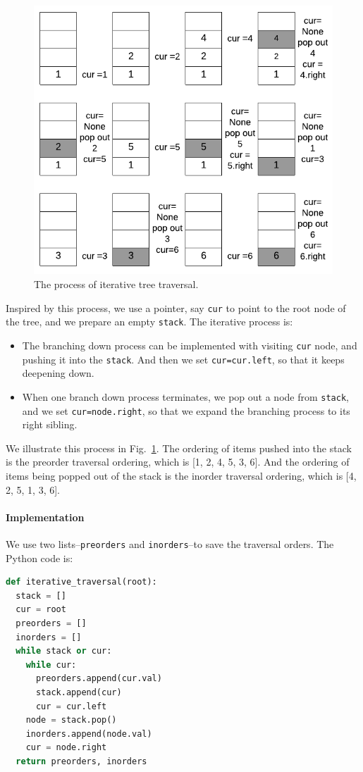 \documentclass[main.tex]{subfiles}
\begin{document}
\begin{figure}[!ht]
    \centering
    \includegraphics[width = .9\columnwidth]{fig/iterative_tree_traversal.png}
    \caption{The process of iterative tree traversal.}
    \label{fig:iterative_tree_traveral}
\end{figure}

Inspired by this process, we use a pointer, say \texttt{cur} to point to the root node of the tree, and we prepare an empty \texttt{stack}. The iterative process is:
\begin{itemize}
    \item The branching down process can be implemented with visiting  \texttt{cur} node, and pushing it into the \texttt{stack}. And then we set \texttt{cur=cur.left}, so that it keeps deepening down. 
    \item When one branch down process terminates, we pop out a node from \texttt{stack}, and we set \texttt{cur=node.right}, so that we expand the branching process to its right sibling. 
\end{itemize}
We illustrate this process in Fig.~\ref{fig:iterative_tree_traveral}. The ordering of items pushed into the stack is the preorder traversal ordering, which is [1, 2, 4, 5, 3, 6]. And the ordering of items being popped out of the stack is the inorder traversal ordering, which is [4, 2, 5, 1, 3, 6].  

\paragraph{Implementation} We use two lists--\texttt{preorders} and \texttt{inorders}--to save the traversal orders. The Python code is:
\begin{lstlisting}[language=Python]
def iterative_traversal(root):
  stack = []
  cur = root
  preorders = []
  inorders = []
  while stack or cur:
    while cur:
      preorders.append(cur.val)
      stack.append(cur)
      cur = cur.left
    node = stack.pop()
    inorders.append(node.val)
    cur = node.right
  return preorders, inorders
\end{lstlisting}
\end{document}
